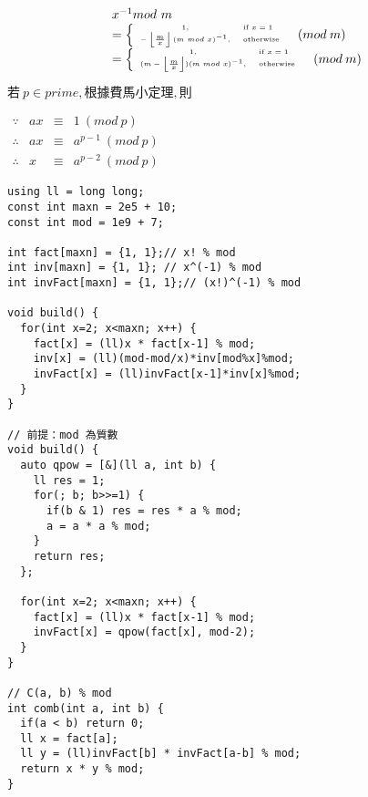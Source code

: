 \[
    \begin{array}{l}
        x^{-1} mod \ m \\
        \begin{tiny}
            = \begin{cases}
                \begin{array}{cl}
                    1, & \text{if} \ x=1 \\
                    -\left \lfloor\frac{m}{x} \right\rfloor(m \ mod \ x)^{-1}, & \text{otherwise}
                \end{array}
            \end{cases}(mod \ m)
        \end{tiny} \\
        \begin{tiny}
            = \begin{cases}
                \begin{array}{cl}
                    1, & \text{if} \ x=1 \\
                    (m-\left \lfloor\frac{m}{x} \right\rfloor)(m \ mod \ x)^{-1}, & \text{otherwise}
                \end{array}
            \end{cases}(mod \ m)
        \end{tiny}
    \end{array}
\]

{\raggedright
    \(若 \ p \in prime, 根據費馬小定理, 則 \) \par
    \(
        \begin{array}{rrcl}
            \because & ax & \equiv & 1 \ (mod \ p) \\
            \therefore & ax & \equiv & a^{p-1} \ (mod \ p) \\
            \therefore & x & \equiv & a^{p-2} \ (mod \ p)
        \end{array}
    \) \par
}

\begin{lstlisting}
using ll = long long;
const int maxn = 2e5 + 10;
const int mod = 1e9 + 7;

int fact[maxn] = {1, 1};// x! % mod
int inv[maxn] = {1, 1}; // x^(-1) % mod
int invFact[maxn] = {1, 1};// (x!)^(-1) % mod

void build() {
  for(int x=2; x<maxn; x++) {
    fact[x] = (ll)x * fact[x-1] % mod;
    inv[x] = (ll)(mod-mod/x)*inv[mod%x]%mod;
    invFact[x] = (ll)invFact[x-1]*inv[x]%mod;
  }
}

// 前提：mod 為質數
void build() {
  auto qpow = [&](ll a, int b) {
    ll res = 1;
    for(; b; b>>=1) {
      if(b & 1) res = res * a % mod;
      a = a * a % mod;
    }
    return res;
  };
  
  for(int x=2; x<maxn; x++) {
    fact[x] = (ll)x * fact[x-1] % mod;
    invFact[x] = qpow(fact[x], mod-2);
  }
}

// C(a, b) % mod
int comb(int a, int b) {
  if(a < b) return 0;
  ll x = fact[a];
  ll y = (ll)invFact[b] * invFact[a-b] % mod;
  return x * y % mod;
}
\end{lstlisting}
